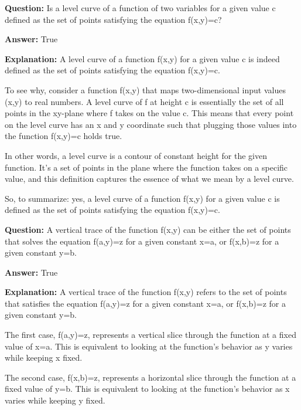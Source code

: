 \documentclass{article}
\begin{document}
                \vspace{0.5cm} 
        
            
                \textbf {Question:} Is a level curve of a function of two variables for a given value c defined as the set of points satisfying the equation f(x,y)=c?
                
                \textbf{Answer:} True

                \textbf{Explanation:} A level curve of a function f(x,y) for a given value c is indeed defined as the set of points satisfying the equation f(x,y)=c.

To see why, consider a function f(x,y) that maps two-dimensional input values (x,y) to real numbers. A level curve of f at height c is essentially the set of all points in the xy-plane where f takes on the value c. This means that every point on the level curve has an x and y coordinate such that plugging those values into the function f(x,y)=c holds true.

In other words, a level curve is a contour of constant height for the given function. It's a set of points in the plane where the function takes on a specific value, and this definition captures the essence of what we mean by a level curve.

So, to summarize: yes, a level curve of a function f(x,y) for a given value c is defined as the set of points satisfying the equation f(x,y)=c.
                
                \vspace{0.5cm} 
        
            
                \textbf {Question:} A vertical trace of the function f(x,y) can be either the set of points that solves the equation f(a,y)=z for a given constant x=a, or f(x,b)=z for a given constant y=b.
                
                \textbf{Answer:} True

                \textbf{Explanation:} A vertical trace of the function f(x,y) refers to the set of points that satisfies the equation f(a,y)=z for a given constant x=a, or f(x,b)=z for a given constant y=b.

The first case, f(a,y)=z, represents a vertical slice through the function at a fixed value of x=a. This is equivalent to looking at the function's behavior as y varies while keeping x fixed.

The second case, f(x,b)=z, represents a horizontal slice through the function at a fixed value of y=b. This is equivalent to looking at the function's behavior as x varies while keeping y fixed.
\end{document}
